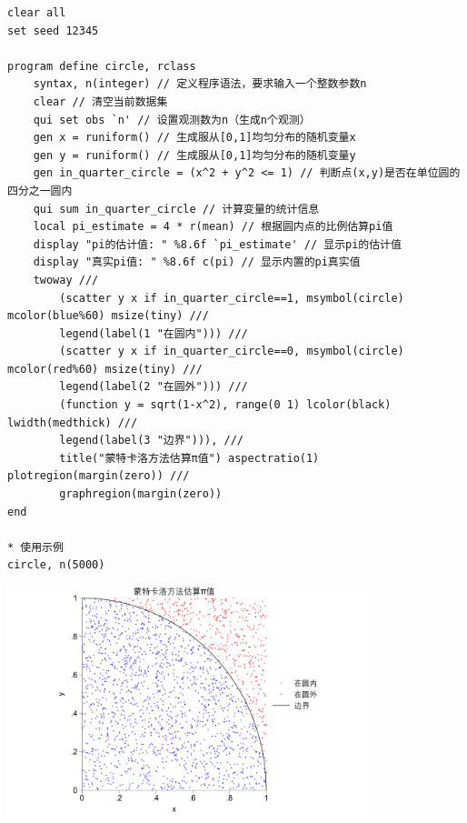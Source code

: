 \begin{tcolorbox}[title=在 Stata 中实现模拟法, colback=white, colframe=black, colbacktitle=white, coltitle=black,fonttitle=\bfseries]
	\begin{lstlisting}[xleftmargin=2em, commentstyle=\color{black}]
clear all
set seed 12345

program define circle, rclass
	syntax, n(integer) // 定义程序语法，要求输入一个整数参数n
	clear // 清空当前数据集
	qui set obs `n' // 设置观测数为n（生成n个观测）
	gen x = runiform() // 生成服从[0,1]均匀分布的随机变量x
	gen y = runiform() // 生成服从[0,1]均匀分布的随机变量y
	gen in_quarter_circle = (x^2 + y^2 <= 1) // 判断点(x,y)是否在单位圆的四分之一圆内
	qui sum in_quarter_circle // 计算变量的统计信息
	local pi_estimate = 4 * r(mean) // 根据圆内点的比例估算pi值
	display "pi的估计值: " %8.6f `pi_estimate' // 显示pi的估计值
	display "真实pi值: " %8.6f c(pi) // 显示内置的pi真实值
	twoway ///
		(scatter y x if in_quarter_circle==1, msymbol(circle) mcolor(blue%60) msize(tiny) ///
		legend(label(1 "在圆内"))) ///
		(scatter y x if in_quarter_circle==0, msymbol(circle) mcolor(red%60) msize(tiny) ///
		legend(label(2 "在圆外"))) ///
		(function y = sqrt(1-x^2), range(0 1) lcolor(black) lwidth(medthick) ///
		legend(label(3 "边界"))), ///
		title("蒙特卡洛方法估算π值") aspectratio(1) plotregion(margin(zero)) ///
		graphregion(margin(zero))		
end

* 使用示例
circle, n(5000)
	\end{lstlisting}
	\vspace{2em}
	\begin{center}
	\includegraphics[width=0.8\textwidth]{image/circle_pi.pdf}
	\end{center}
\end{tcolorbox}

